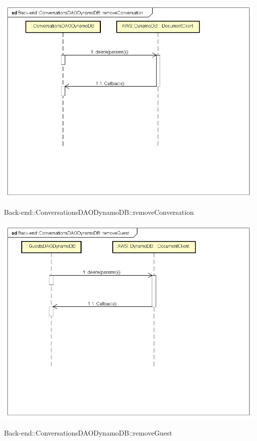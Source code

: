 \includegraphics[width=\textwidth,height=\textheight,keepaspectratio]{images/diagrams/back-end/Ufficial_Backend/Back-end__ConversationsDAODynamoDB__removeConversation.png} 	\caption{Back-end::ConversationsDAODynamoDB::removeConversation}
\includegraphics[width=\textwidth,height=\textheight,keepaspectratio]{images/diagrams/back-end/Ufficial_Backend/Back-end__ConversationsDAODynamoDB__removeGuest.png} 	\caption{Back-end::ConversationsDAODynamoDB::removeGuest}
